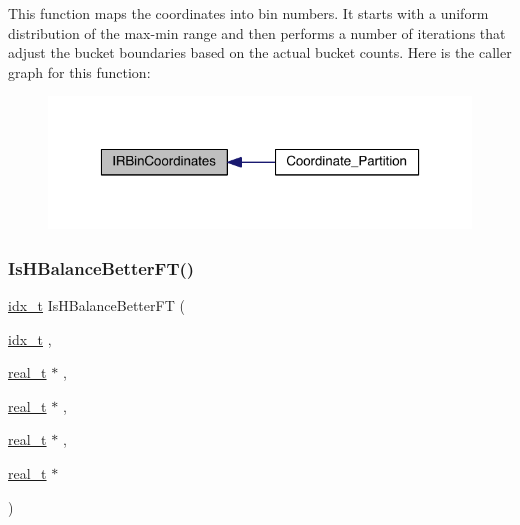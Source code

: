 This function maps the coordinates into bin numbers. It starts with a uniform distribution of the max-\/min range and then performs a number of iterations that adjust the bucket boundaries based on the actual bucket counts. Here is the caller graph for this function\+:\nopagebreak
\begin{figure}[H]
\begin{center}
\leavevmode
\includegraphics[width=320pt]{a00951_a868c9811f572c62917c5e8cc22dd92a9_icgraph}
\end{center}
\end{figure}
\mbox{\label{a00951_aaff2025f2859f7fde3ab3b2dfea6291a}} 
\subsubsection{\texorpdfstring{Is\+H\+Balance\+Better\+F\+T()}{IsHBalanceBetterFT()}}
{\footnotesize\ttfamily \hyperlink{a00876_aaa5262be3e700770163401acb0150f52}{idx\+\_\+t} Is\+H\+Balance\+Better\+FT (\begin{DoxyParamCaption}\item[{\hyperlink{a00876_aaa5262be3e700770163401acb0150f52}{idx\+\_\+t}}]{,  }\item[{\hyperlink{a00876_a1924a4f6907cc3833213aba1f07fcbe9}{real\+\_\+t} $\ast$}]{,  }\item[{\hyperlink{a00876_a1924a4f6907cc3833213aba1f07fcbe9}{real\+\_\+t} $\ast$}]{,  }\item[{\hyperlink{a00876_a1924a4f6907cc3833213aba1f07fcbe9}{real\+\_\+t} $\ast$}]{,  }\item[{\hyperlink{a00876_a1924a4f6907cc3833213aba1f07fcbe9}{real\+\_\+t} $\ast$}]{ }\end{DoxyParamCaption})}

\mbox{\label{a00951_ad2c8059aa7e771e9ea532b56efd475c4}} 
